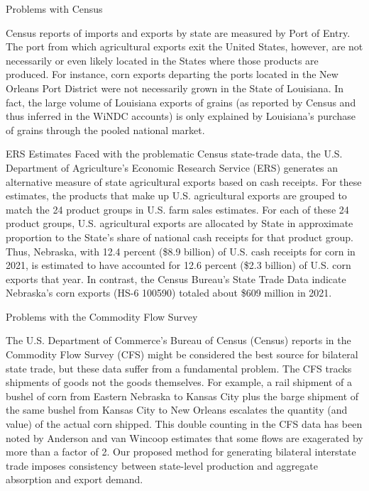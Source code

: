 \documentclass[10pt]{beamer}
\begin{document}
\begin{frame}{Problems with Census}

Census reports of imports and exports by state are measured by Port of
Entry. The port from which agricultural exports exit the United
States, however, are not necessarily or even likely located in the
States where those products are produced. For instance, corn exports
departing the ports located in the New Orleans Port District were not
necessarily grown in the State of Louisiana. In fact, the large volume
of Louisiana exports of grains (as reported by Census and thus
inferred in the WiNDC accounts) is only explained by Louisiana's
purchase of grains through the pooled national market. 

\end{frame}

\begin{frame}{ERS Estimates }
Faced with the problematic Census state-trade data, the U.S.
Department of Agriculture's Economic Research Service (ERS) generates
an alternative measure of state agricultural exports based on cash
receipts.  For these estimates, the products that make up U.S.
agricultural exports are grouped to match the 24 product groups in
U.S. farm sales estimates. For each of these 24 
product groups, U.S. agricultural exports are allocated by State in
approximate proportion to the State's share of national cash receipts
for that product group. Thus, Nebraska, with 12.4 percent (\$8.9
billion) of U.S. cash receipts for corn in 2021, is estimated to have
accounted for 12.6 percent (\$2.3 billion) of U.S. corn exports that
year. In contrast, the Census Bureau's State Trade Data
indicate Nebraska's corn exports (HS-6 100590) totaled about \$609
million in 2021.
\end{frame}


\begin{frame}{Problems with the Commodity Flow Survey}

The U.S. Department of Commerce's Bureau of Census (Census) reports in
the Commodity Flow Survey (CFS) might be considered the best source
for bilateral state trade, but these data suffer from a fundamental
problem. The CFS tracks shipments of goods not the goods themselves.
For example, a rail shipment of a bushel of corn from Eastern Nebraska
to Kansas City plus the barge shipment of the same bushel from Kansas
City to New Orleans escalates the quantity (and value) of the actual
corn shipped. This double counting in the CFS data has been noted by
Anderson and van Wincoop estimates that some flows are exagerated by
more than a factor of 2. Our proposed method for generating bilateral
interstate trade imposes consistency between state-level production
and aggregate absorption and export demand. 

\end{frame}
\end{document}
